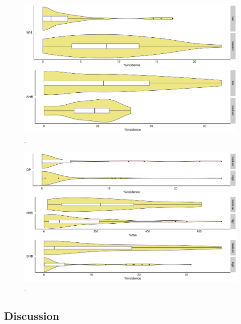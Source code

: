 \begin{figure}
        \includegraphics[width = 1\textwidth]{figures/TM_yield_box.pdf}
        \caption{.}
\label{fig:OR.yield.box}
\end{figure}

\begin{figure}
        \includegraphics[width = 1\textwidth]{figures/WJ_yield_box.pdf}
        \caption{.}
\label{fig:OR.yield.box}
\end{figure}

\subsection{Discussion}

